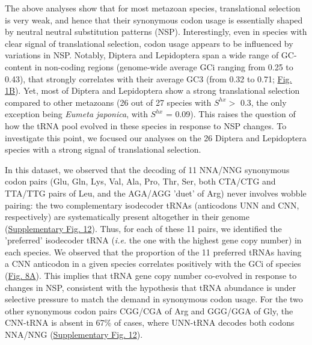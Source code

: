 The above analyses show that for most metazoan species, translational selection is very weak, and hence that their synonymous codon usage is essentially shaped by neutral neutral substitution patterns (NSP). Interestingly, even in species with clear signal of translational selection, codon usage appears to be influenced by variations in NSP. Notably, Diptera and Lepidoptera span a wide range of GC-content in non-coding regions (genome-wide average GCi ranging from 0.25 to 0.43), that strongly correlates with their average GC3 (from 0.32 to 0.71; \hyperref[fig:CU1]{Fig. 1B}). Yet, most of Diptera and Lepidoptera show a strong translational selection compared to other metazoans (26 out of 27 species with $S^{hx}>$ 0.3, the only exception being \textit{Eumeta japonica}, with $S^{hx}$ = 0.09). This raises the question of how the tRNA pool evolved in these species in response to NSP changes. To investigate this point, we focused our analyses on the 26 Diptera and Lepidoptera species with a strong signal of translational selection.

In this dataset, we observed that the decoding of 11 NNA/NNG synonymous codon pairs (Glu, Gln, Lys, Val, Ala, Pro, Thr, Ser, both CTA/CTG and TTA/TTG pairs of Leu, and the AGA/AGG 'duet' of Arg) never involves wobble pairing: the two complementary isodecoder tRNAs (anticodons UNN and CNN, respectively) are systematically present altogether in their genome (\hyperref[suppfig:CU12]{Supplementary Fig. 12}). Thus, for each of these 11 pairs, we identified the 'preferred' isodecoder tRNA (\textit{i.e.} the one with the highest gene copy number) in each species. We observed that the proportion of the 11 preferred tRNAs having a CNN anticodon in a given species correlates positively with the GCi of species (\hyperref[fig:CU8]{Fig. 8A}). This implies that tRNA gene copy number co-evolved in response to changes in NSP, consistent with the hypothesis that tRNA abundance is under selective pressure to match the demand in synonymous codon usage. For the two other synonymous codon pairs CGG/CGA of Arg and GGG/GGA of Gly, the CNN-tRNA is absent in 67\% of cases, where UNN-tRNA decodes both codons NNA/NNG (\hyperref[suppfig:CU12]{Supplementary Fig. 12}). 

